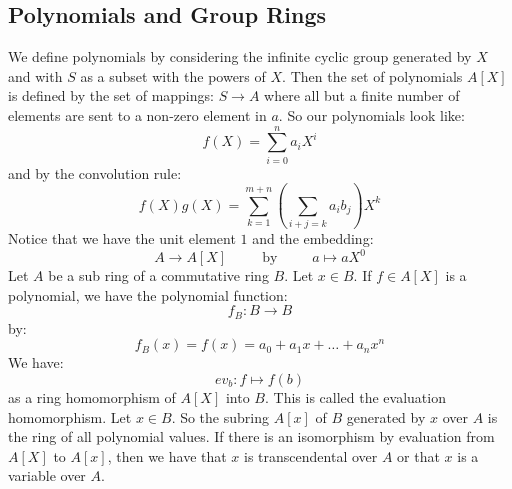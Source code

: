 \documentclass{report}
\begin{document}
\begin{topic}
    \section{Polynomials and Group Rings}
\end{topic}

We define polynomials by considering the infinite cyclic group generated by $X$ and with $S$ as a subset with the powers of $X$. Then the set of polynomials $A[X]$ is defined by the set of mappings: $S \rightarrow A$ where all but a finite number of elements are sent to a non-zero element in $a$. So our polynomials look like:
    \begin{equation*}
        f(X) = \sum_{i= 0}^{n} a_{i}X^{i}
    \end{equation*}
and by the convolution rule:
    \begin{equation*}
        f(X)g(X) = \sum_{k = 1}^{m + n}\left(\sum_{i + j = k}^{} a_{i}b_{j}\right)X^{k}
    \end{equation*}
Notice that we have the unit element $1$ and the embedding:
    \begin{equation*}
        A \rightarrow A[X] \hspace{30pt} \text{by} \hspace{30pt} a \mapsto aX^{0}
    \end{equation*}
Let $A$ be a sub ring of a commutative ring $B$. Let $x \in B$. If $f \in A[X]$ is a polynomial, we have the polynomial function:
    \begin{equation*}
        f_{B} : B \rightarrow B
    \end{equation*}
by:
    \begin{equation*}
        f_{B}(x) = f(x) = a_{0} + a_{1}x + \ldots + a_{n}x^{n}
    \end{equation*}
We have:   
    \begin{equation*}
        ev_{b}: f \mapsto f(b)
    \end{equation*}
as a ring homomorphism of $A[X]$ into $B$. This is called the evaluation homomorphism. Let $x \in B$. So the subring $A[x]$ of $B$ generated by $x$ over $A$ is the ring of all polynomial values. If there is an isomorphism by evaluation from $A[X]$ to $A[x]$, then we have that $x$ is transcendental over $A$ or that $x$ is a variable over $A$. 
\end{document}
